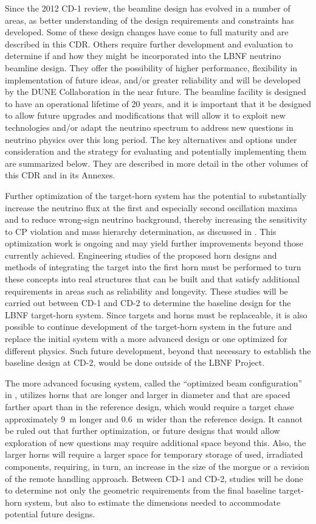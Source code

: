 Since the 2012 CD-1 review, the beamline design has evolved in a number of areas, as better understanding of the design requirements and constraints has developed.  Some of these design changes have come to full maturity and are 
described in this CDR.  Others require further development and evaluation to determine if and how they might be incorporated into the LBNF neutrino beamline design.  They offer the possibility of higher performance, flexibility in 
implementation of future ideas, and/or greater reliability and will be developed by the DUNE
Collaboration in the near future. The beamline facility is designed to have an operational lifetime of 20 years, and it is important that it be designed to allow future upgrades and modifications that will allow it to 
exploit new 
technologies and/or adapt the neutrino spectrum to address new questions in neutrino physics over this long period. The key alternatives and options under consideration and the strategy for evaluating and potentially implementing them are summarized below.  They are described in more detail in the other volumes of this CDR and in its Annexes.  
               
 
Further optimization of the target-horn system has the potential to substantially increase the neutrino flux at the first and especially second oscillation maxima and to reduce wrong-sign neutrino background, thereby increasing the sensitivity to CP 
violation and mass hierarchy determination, as discussed in \volphys.  This optimization work is ongoing and may yield further improvements beyond those currently achieved. Engineering studies of the proposed horn designs and methods 
of integrating the target into the first horn must be performed to turn these concepts into real structures that can be built and that satisfy additional requirements in areas such as reliability and longevity.  These studies will be carried out between CD-1 and CD-2 to 
determine the baseline design for the LBNF target-horn system.  Since targets and horns must be replaceable, it is also possible to continue development of the target-horn system in the future and replace the initial system with a more advanced 
design or one optimized for different physics.  Such future development, beyond that necessary to establish the baseline design at CD-2, would be done outside of the LBNF Project.
 
The more advanced focusing system, called the ``optimized beam configuration'' in \volphys, utilizes horns that are longer and larger in diameter and that are spaced farther apart than in the reference design, which would require a target chase approximately 9~m longer and 0.6~m wider 
than the reference design.  It cannot be ruled out that further optimization, or future designs that would
allow exploration of new questions may require additional space beyond this.  Also, the larger horns will require a larger 
space for temporary storage of used, irradiated components, requiring, in turn, an increase in the size of the morgue or a revision of the remote handling approach.  Between CD-1 and CD-2, studies will be done to determine not only the geometric 
requirements from the final baseline target-horn system, but also to estimate the dimensions needed to accommodate potential future designs.
 
